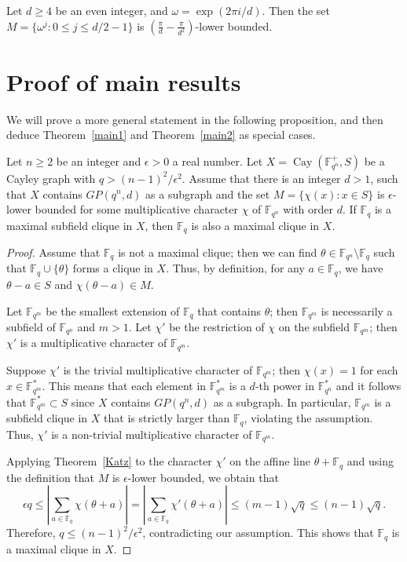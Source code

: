 \documentclass[Unicode,ALCO,published]{cedram}
\newcommand{\F}{\mathbb{F}}
\begin{document}
\begin{lemm}[{\cite[Lemma 4.5]{AY}}]\label{GP*lem} 
Let $d \geq 4$ be an even integer, and $\omega=\exp(2\pi i/d)$. Then the set $M=\{\omega^j :0 \leq j \leq d/2-1\}$ is $\left(\frac{\pi}{d}-\frac{\pi}{d^2}\right)$-lower bounded.
\end{lemm}

\section{Proof of main results}

We will prove a more general statement in the following proposition, and then deduce Theorem~\ref{main1} and Theorem~\ref{main2} as special cases.

\begin{prop}\label{mainprop}
Let $n \geq 2$ be an integer and $\epsilon>0$ a real number. Let $X=\operatorname{Cay}(\F_{q^n}^+, S)$ be a Cayley graph with $q>(n-1)^2/\epsilon^2$. Assume that there is an integer $d>1$, such that $X$ contains $GP(q^n,d)$ as a subgraph and the set $M=\{\chi(x): x \in S\}$ is $\epsilon$-lower bounded for some multiplicative character $\chi$ of $\F_{q^n}$ with order $d$. If $\F_q$ is a maximal subfield clique in $X$, then $\F_q$ is also a maximal clique in $X$.
\end{prop}
\begin{proof}
Assume that $\F_q$ is not a maximal clique; then we can find $\theta \in \F_{q^n} \setminus \F_q$ such that $\F_q \cup \{\theta\}$ forms a clique in $X$. Thus, by definition, for any $a \in \F_q$, we have $\theta-a \in S$ and $\chi(\theta-a) \in M$.

Let $\F_{q^m}$ be the smallest extension of $\F_q$ that contains $\theta$; then $\F_{q^m}$ is necessarily a subfield of $\F_{q^n}$ and $m>1$. Let $\chi'$ be the restriction of $\chi$ on the subfield $\F_{q^m}$; then $\chi'$ is a multiplicative character of $\F_{q^m}$. 

Suppose $\chi'$ is the trivial multiplicative character of $\F_{q^m}$; then $\chi(x)=1$ for each $x \in \F_{q^m}^*$. This means that each element in $\F_{q^m}^*$ is a $d$-th power in $\F_{q^n}^*$ and it follows that $\F_{q^m}^* \subset S$ since $X$ contains $GP(q^n,d)$ as a subgraph. In particular, $\F_{q^m}$ is a subfield clique in $X$ that is strictly larger than $\F_q$, violating the assumption. Thus, $\chi'$ is a non-trivial multiplicative character of $\F_{q^m}$. 

Applying Theorem~\ref{Katz} to the character $\chi'$ on the affine line $\theta+\F_q$ and using the definition that $M$ is $\epsilon$-lower bounded, we obtain that
$$
\epsilon q \leq \left|\sum_{a \in \mathbb{F}_{q}} \chi(\theta+a)\right| =\left|\sum_{a \in \mathbb{F}_{q}} \chi'(\theta+a)\right|\leq(m-1) \sqrt{q} \leq (n-1)\sqrt{q}.
$$
Therefore, $q \leq (n-1)^2/\epsilon^2$, contradicting our assumption. This shows that $\F_q$ is a maximal clique in $X$.
\end{proof}
\end{document}
